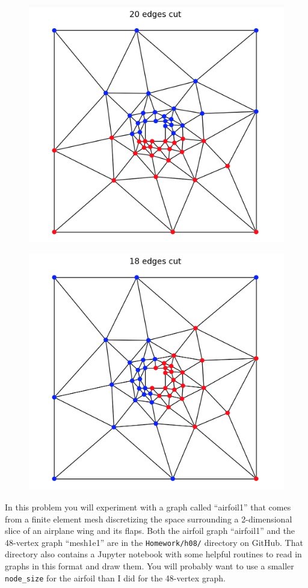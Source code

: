 \documentclass[11pt]{article}
\begin{document}
\begin{figure}[h]
\centering
\begin{minipage}{.5\textwidth}
  \centering
  \includegraphics[width=.65\linewidth]{geometric20}
  \label{fig:geometric}
\end{minipage}%
\begin{minipage}{.5\textwidth}
  \centering
  \includegraphics[width=.65\linewidth]{spectral18}
  \label{fig:spectral}
\end{minipage}
\end{figure}

In this problem you will experiment with a graph called ``airfoil1''
that comes from a finite element mesh discretizing the space surrounding 
a 2-dimensional slice of an airplane wing and its flaps.
Both the airfoil graph ``airfoil1'' and the 48-vertex graph ``mesh1e1'' are in
the {\tt Homework/h08/} directory on GitHub.
That directory also contains a Jupyter notebook with some helpful routines to
read in graphs in this format and draw them.
You will probably want to use a smaller {\tt node\_size} for the airfoil than 
I did for the 48-vertex graph.
\end{document}
